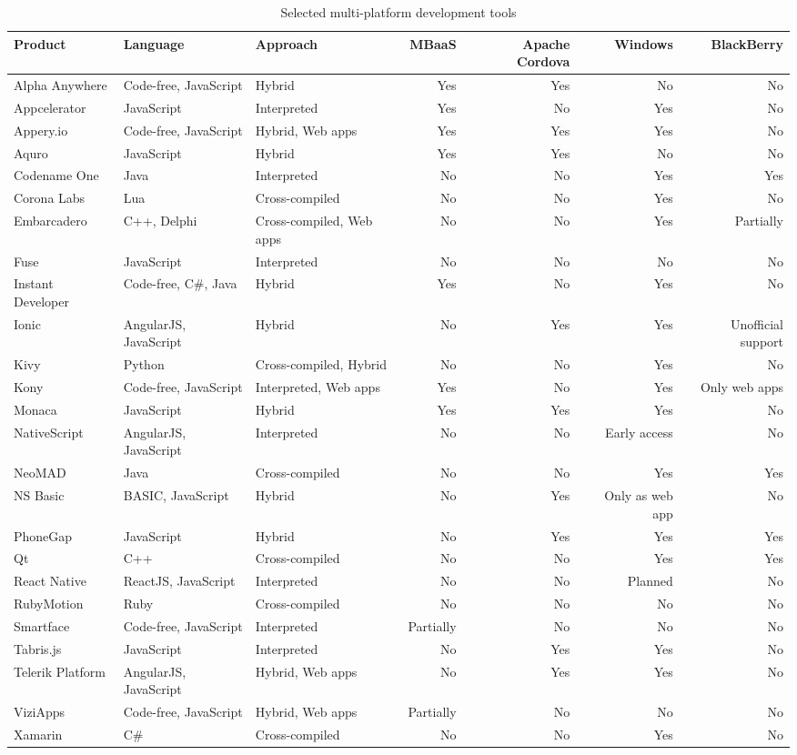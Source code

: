 \documentclass[english,master,public,dept460,male,cpdeclaration,oneside]{diploma}
\begin{document}
\begin{table}
	\centering
	\caption{Selected multi-platform development tools}
	\begin{tabular}{l l l r r r r}
		\toprule
		Product & Language & Approach & MBaaS & Apache Cordova & Windows & BlackBerry \\
		\midrule
		Alpha Anywhere & Code-free, JavaScript & Hybrid & Yes & Yes & No & No \\
		Appcelerator & JavaScript & Interpreted & Yes & No & Yes & No \\
		Appery.io & Code-free, JavaScript & Hybrid, Web apps & Yes & Yes & Yes & No \\
		Aquro & JavaScript & Hybrid & Yes & Yes & No & No \\
		Codename One & Java & Interpreted & No & No & Yes & Yes \\
		Corona Labs & Lua & Cross-compiled & No & No & Yes & No \\
		Embarcadero & C++, Delphi & Cross-compiled, Web apps & No & No & Yes & Partially \\
		Fuse & JavaScript & Interpreted & No & No & No & No \\
		Instant Developer & Code-free, C\#, Java & Hybrid & Yes & No & Yes & No \\
		Ionic & AngularJS, JavaScript & Hybrid & No & Yes & Yes & Unofficial support \\
		Kivy & Python & Cross-compiled, Hybrid & No & No & Yes & No \\
		Kony & Code-free, JavaScript & Interpreted, Web apps & Yes & No & Yes & Only web apps \\
		Monaca & JavaScript & Hybrid & Yes & Yes & Yes & No \\
		NativeScript & AngularJS, JavaScript & Interpreted & No & No & Early access & No \\
		NeoMAD & Java & Cross-compiled & No & No & Yes & Yes \\
		NS Basic & BASIC, JavaScript & Hybrid & No & Yes & Only as web app & No \\
		PhoneGap & JavaScript & Hybrid & No & Yes & Yes & Yes \\
		Qt & C++ & Cross-compiled & No & No & Yes & Yes \\
		React Native & ReactJS, JavaScript & Interpreted & No & No & Planned & No \\
		RubyMotion & Ruby & Cross-compiled & No & No & No & No \\
		Smartface & Code-free, JavaScript & Interpreted & Partially & No & No & No \\
		Tabris.js & JavaScript & Interpreted & No & Yes & Yes & No \\
		Telerik Platform & AngularJS, JavaScript & Hybrid, Web apps & No & Yes & Yes & No \\
		ViziApps & Code-free, JavaScript & Hybrid, Web apps & Partially & No & No & No \\
		Xamarin & C\# & Cross-compiled & No & No & Yes & No \\
		\midrule
	\end{tabular}
\end{table}
\end{document}
